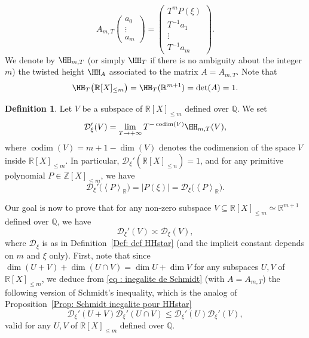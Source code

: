 \documentclass[JEP,XML,SOM,Unicode,NoFloatCountersInSection,published]{cedram}
\DeclareMathOperator\codim{codim}
\newcommand\bQ{\mathbb{Q}}
\newcommand\bR{\mathbb{R}}
\newcommand\bZ{\mathbb{Z}}
\newcommand\HHH{\mathcal{D}_\xi'}
\newcommand\HHstar{\mathcal{D}_{\xi}}
\newcommand{\Vect}[2][]{\left\la #2\right\ra_{#1}}
\let\subset \subseteq
\let\la\langle
\let\ra\rangle
\theoremstyle{definition}
\newtheorem{Def}{Definition}[section]
\theoremstyle{plain}
\begin{document}
\begin{equation}
\label{eq: expression de Ax pour la hauteur T}
A_{m,T}\begin{pmatrix}
a_0 \\
\vdots \\
a_{m}
\end{pmatrix}=
\begin{pmatrix}
T^{m}P(\xi) \\
T^{-1}a_1 \\
\vdots \\
T^{-1} a_m
\end{pmatrix}.
\end{equation}
We denote by $\HH_{m,T}$ (or simply $\HH_T$ if there is no ambiguity about the integer $m$) the twisted height $\HH_{A}$ associated to the matrix $A=A_{m,T}$. Note that
\[
\HH_{T}\big(\bR[X]_{\leq m}\big) = \HH_{T}(\bR^{m+1}) = \det(A) = 1.
\]

\begin{Def}
Let $V$ be a subspace of $\bR[X]_{\leq m}$ defined over $\bQ$. We set
\begin{equation*}
\HHH(V) = \lim_{T\to+\infty} T^{-\codim(V)}\HH_{m,T}(V),
\end{equation*}
where $\codim(V) = m+1-\dim(V)$ denotes the codimension of the space $V$ inside $\bR[X]_{\leq m}$. In particular, $\HHH(\bR[X]_{\leq n}) = 1$, and for any primitive polynomial $P\in \bZ[X]_{\leq m}$, we have
\[
\HHH\big(\Vect[\bR]{P}\big) = |P(\xi)| = \HHstar\big(\Vect[\bR]{P}\big).
\]
\end{Def}

Our goal is now to prove that for any non-zero subspace $V\subset\bR[X]_{\leq m} \simeq \bR^{m+1}$ defined over $\bQ$, we have
\[
\HHH(V) \asymp \HHstar(V),
\]
where $\HHstar$ is as in Definition~\ref{Def: def HHstar} (and the implicit constant depends on $m$ and $\xi$ only). First, note that since $\dim(U+V) + \dim(U\cap V) = \dim U + \dim V$ for any subspaces $U,V$ of $\bR[X]_{\leq m}$, we deduce from \eqref{eq : inegalite de Schmidt} (with $A=A_{m,T}$) the following version of Schmidt's inequality, which is the analog of Proposition~\ref{Prop: Schmidt inegalite pour HHstar}
\begin{equation}
\label{eq : inegalite de Schmidt new}
\HHH(U+V) \HHH(U\cap V) \leq \HHH(U) \HHH(V),
\end{equation}
valid for any $U,V$ of $\bR[X]_{\leq m}$ defined over $\bQ$.
\end{document}
